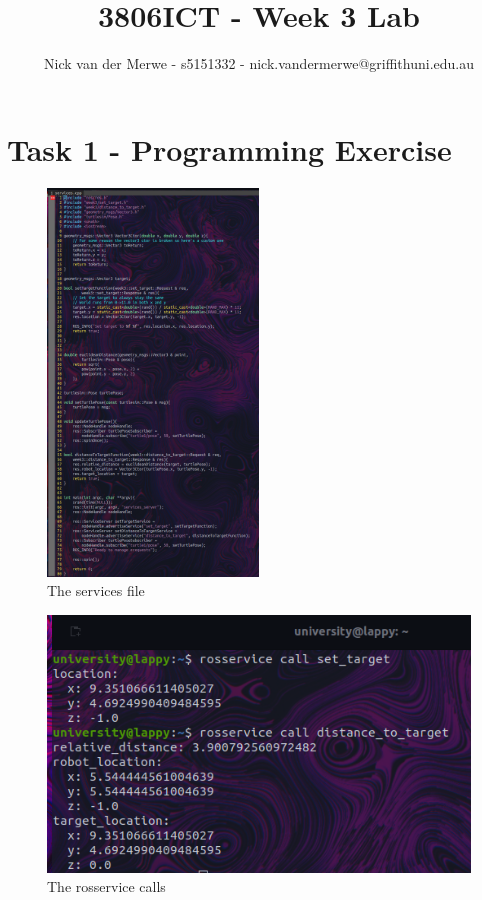 \documentclass{article}
\title{3806ICT - Week 3 Lab}
\author{Nick van der Merwe - s5151332 - nick.vandermerwe@griffithuni.edu.au}
\begin{document}
\maketitle

\section{Task 1 - Programming Exercise}
\begin{figure}[ht]
    \caption{The services file}
    \centering
    \includegraphics[width=0.50\textwidth]{img/services.png}
\end{figure}

\begin{figure}[h]
    \caption{The rosservice calls}
    \centering
    \includegraphics[width=1\textwidth]{img/rosservice.png}
\end{figure}
\end{document}
